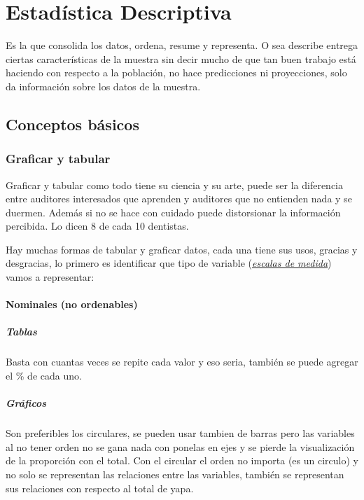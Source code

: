 \documentclass[letterpaper,10pt,openany,oneside]{sphinxmanual}
\begin{document}
\chapter{Estadística Descriptiva}
\label{Estadistica_Descriptiva:estadistica-descriptiva}\label{Estadistica_Descriptiva::doc}
Es la que consolida los datos, ordena, resume y representa. O sea describe entrega ciertas
características de la muestra sin decir mucho de que tan buen trabajo está haciendo con
respecto a la población, no hace predicciones ni proyecciones, solo da información sobre
los datos de la muestra.


\section{Conceptos básicos}
\label{Estadistica_Descriptiva:conceptos-basicos}

\subsection{Graficar y tabular}
\label{Estadistica_Descriptiva:graficar-y-tabular}
Graficar y tabular como todo tiene su ciencia y su arte, puede ser la diferencia entre
auditores interesados que aprenden y auditores que no entienden nada y se duermen. Además
si no se hace con cuidado puede distorsionar la información percibida. Lo dicen 8 de cada
10 dentistas.

Hay muchas formas de tabular y graficar datos, cada una tiene sus usos, gracias y
desgracias, lo primero es identificar que tipo de variable ({\hyperref[Estadistica:escalas-de-medida]{\emph{escalas de medida}}}) vamos a representar:


\subsubsection{Nominales (no ordenables)}
\label{Estadistica_Descriptiva:nominales-no-ordenables}

\paragraph{Tablas}
\label{Estadistica_Descriptiva:tablas}
Basta con cuantas veces se repite cada valor y eso seria, también se puede agregar el \% de cada uno.


\paragraph{Gráficos}
\label{Estadistica_Descriptiva:graficos}
Son preferibles los circulares, se pueden usar tambien de barras pero las variables al
no tener orden no se gana nada con ponelas en ejes y se pierde la visualización de
la proporción con el total. Con el circular el orden no importa (es un circulo) y no
solo se representan las relaciones entre las variables, también se representan sus
relaciones con respecto al total de yapa.
\end{document}
